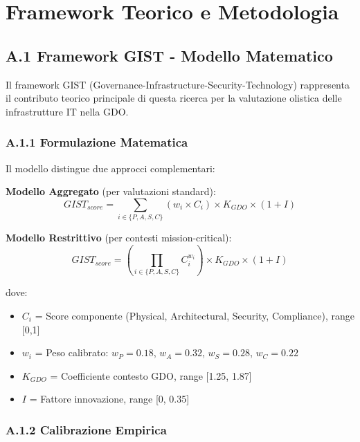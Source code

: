 \appendix
\chapter{\texorpdfstring{\textbf{Framework Teorico e Metodologia}}{Appendice A - Framework Teorico e Metodologia}}

\section{\texorpdfstring{\textbf{A.1 Framework GIST - Modello Matematico}}{A.1 - Framework GIST - Modello Matematico}}

Il framework GIST (Governance-Infrastructure-Security-Technology) rappresenta il contributo teorico principale di questa ricerca per la valutazione olistica delle infrastrutture IT nella GDO.

\subsection{\texorpdfstring{\textbf{A.1.1 Formulazione Matematica}}{A.1.1 - Formulazione Matematica}}

Il modello distingue due approcci complementari:

\textbf{Modello Aggregato} (per valutazioni standard):
\begin{equation}
GIST_{score} = \sum_{i \in \{P,A,S,C\}} (w_i \times C_i) \times K_{GDO} \times (1+I)
\end{equation}

\textbf{Modello Restrittivo} (per contesti mission-critical):
\begin{equation}
GIST_{score} = \left(\prod_{i \in \{P,A,S,C\}} C_i^{w_i}\right) \times K_{GDO} \times (1+I)
\end{equation}

dove:
\begin{itemize}
    \item $C_i$ = Score componente (Physical, Architectural, Security, Compliance), range [0,1]
    \item $w_i$ = Peso calibrato: $w_P = 0.18$, $w_A = 0.32$, $w_S = 0.28$, $w_C = 0.22$
    \item $K_{GDO}$ = Coefficiente contesto GDO, range [1.25, 1.87]
    \item $I$ = Fattore innovazione, range [0, 0.35]
\end{itemize}

\subsection{\texorpdfstring{\textbf{A.1.2 Calibrazione Empirica}}{A.1.2 - Calibrazione Empirica}}

